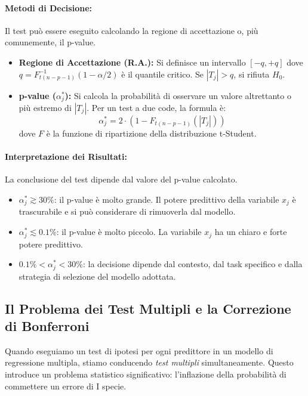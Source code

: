 \paragraph{Metodi di Decisione:} Il test può essere eseguito calcolando la
regione di accettazione o, più comunemente, il p-value.

\begin{itemize}
	\item \textbf{Regione di Accettazione (R.A.):} Si definisce un intervallo
	      \([-q, +q]\) dove \(q = F_{t(n-p-1)}^{-1}(1-\alpha/2)\) è il quantile
	      critico. Se \(|T_j| > q\), si rifiuta \(H_0\).
	\item \textbf{p-value (\(\alpha_j^*\)):} Si calcola la probabilità di
	      osservare un valore altrettanto o più estremo di \(|T_j|\). Per un test a
	      due code, la formula è:
	      \[
		      \alpha_j^* = 2 \cdot (1 - F_{t(n-p-1)}(|T_j|))
	      \]
	      dove \(F\) è la funzione di ripartizione della distribuzione
	      t-Student.
\end{itemize}

\paragraph{Interpretazione dei Risultati:} La conclusione del test dipende dal
valore del p-value calcolato.
\begin{itemize}
	\item \(\alpha_j^* \gtrsim 30\%\): il p-value è molto grande. Il potere
	      predittivo della variabile \(x_j\) è trascurabile e si può considerare di
	      rimuoverla dal modello.
	\item \(\alpha_j^* \lesssim 0.1\%\): il p-value è molto piccolo. La
	      variabile \(x_j\) ha un chiaro e forte potere predittivo.
	\item \(0.1\% < \alpha_j^* < 30\%\): la decisione dipende dal contesto, dal
	      task specifico e dalla strategia di selezione del modello adottata.
\end{itemize}


\subsection{Il Problema dei Test Multipli e la Correzione di Bonferroni}

Quando eseguiamo un test di ipotesi per ogni predittore in un modello di
regressione multipla, stiamo conducendo \textit{test multipli} simultaneamente.
Questo introduce un problema statistico significativo: l'inflazione della
probabilità di commettere un errore di I specie.


